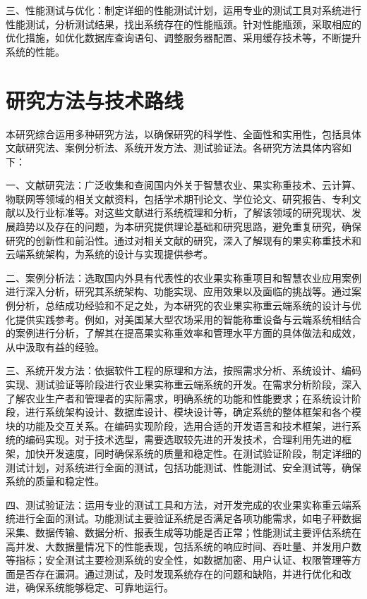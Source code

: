 \documentclass{xduugthesis}
\begin{document}
三、性能测试与优化：制定详细的性能测试计划，运用专业的测试工具对系统进行性能测试，分析测试结果，找出系统存在的性能瓶颈。针对性能瓶颈，采取相应的优化措施，如优化数据库查询语句、调整服务器配置、采用缓存技术等，不断提升系统的性能。


\section{研究方法与技术路线}

本研究综合运用多种研究方法，以确保研究的科学性、全面性和实用性，包括具体文献研究法、案例分析法、系统开发方法、测试验证法。各研究方法具体内容如下：

一、文献研究法：广泛收集和查阅国内外关于智慧农业、果实称重技术、云计算、物联网等领域的相关文献资料，包括学术期刊论文、学位论文、研究报告、专利文献以及行业标准等。对这些文献进行系统梳理和分析，了解该领域的研究现状、发展趋势以及存在的问题，为本研究提供理论基础和研究思路，避免重复研究，确保研究的创新性和前沿性。通过对相关文献的研究，深入了解现有的果实称重技术和云端系统架构，为系统的设计与实现提供参考。

二、案例分析法：选取国内外具有代表性的农业果实称重项目和智慧农业应用案例进行深入分析，研究其系统架构、功能实现、应用效果以及面临的挑战等。通过案例分析，总结成功经验和不足之处，为本研究的农业果实称重云端系统的设计与优化提供实践参考。例如，对美国某大型农场采用的智能称重设备与云端系统相结合的案例\cite{Anisha2019FruitRU}进行分析，了解其在提高果实称重效率和管理水平方面的具体做法和成效，从中汲取有益的经验。

三、系统开发方法：依据软件工程的原理和方法，按照需求分析、系统设计、编码实现、测试验证等阶段\cite{钟珞2005软件工程}进行农业果实称重云端系统的开发。在需求分析阶段，深入了解农业生产者和管理者的实际需求，明确系统的功能和性能要求；在系统设计阶段，进行系统架构设计、数据库设计、模块设计等，确定系统的整体框架和各个模块的功能及交互关系。在编码实现阶段，选用合适的开发语言和技术框架，进行系统的编码实现。对于技术选型，需要选取较先进的开发技术，合理利用先进的框架，加快开发速度，同时确保系统的质量和稳定性。在测试验证阶段，制定详细的测试计划，对系统进行全面的测试，包括功能测试、性能测试、安全测试等，确保系统的质量和稳定性。

四、测试验证法：运用专业的测试工具和方法，对开发完成的农业果实称重云端系统进行全面的测试。功能测试主要验证系统是否满足各项功能需求，如电子秤数据采集、数据传输、数据分析、报表生成等功能是否正常；性能测试主要评估系统在高并发、大数据量情况下的性能表现，包括系统的响应时间、吞吐量、并发用户数等指标；安全测试主要检测系统的安全性，如数据加密、用户认证、权限管理等方面是否存在漏洞。通过测试，及时发现系统存在的问题和缺陷，并进行优化和改进，确保系统能够稳定、可靠地运行。
\end{document}
